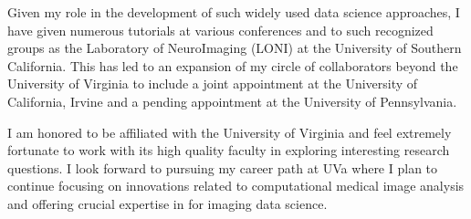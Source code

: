 \documentclass[12pt,]{article}
\begin{document}
Given my role in the development of such widely used data science
approaches, I have given numerous tutorials at various conferences and
to such recognized groups as the Laboratory of NeuroImaging (LONI) at
the University of Southern California. This has led to an expansion of
my circle of collaborators beyond the University of Virginia to include
a joint appointment at the University of California, Irvine and a
pending appointment at the University of Pennsylvania.

I am honored to be affiliated with the University of Virginia and feel
extremely fortunate to work with its high quality faculty in exploring
interesting research questions. I look forward to pursuing my career
path at UVa where I plan to continue focusing on innovations related to
computational medical image analysis and offering crucial expertise in
for imaging data science.
\end{document}
